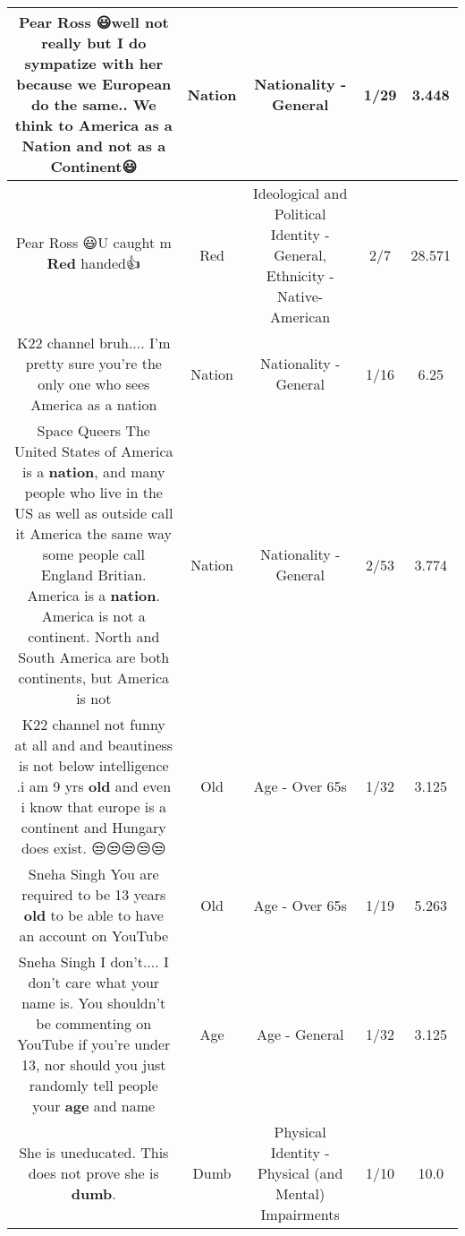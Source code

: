 \documentclass[11pt]{article}
\newlength\mylength
\begin{document}
\begin{center}
\begin{longtable}{|C{.65\mylength}|C{.30\mylength}|C{.12\mylength}|C{.12\mylength}|C{.12\mylength}|}
  \small Pear Ross 😃well not really but I do sympatize with her because we European do the same.. We think to America as a \textbf{Nation} and not as a Continent😃\normalsize   & Nation & Nationality - General & 1/29 & 3.448 \\  \hline
  \small Pear Ross 😃U caught m \textbf{R\textbf{ed}} handed👍\normalsize   & Red &  Ideological and Political Identity - General, Ethnicity - Native-American & 2/7 & 28.571 \\  \hline
  \small K22 channel bruh.... I'm pretty sure you're the only one who sees America as a nation\normalsize   & Nation & Nationality - General & 1/16 & 6.25 \\  \hline
  \small Space Queers The United States of America is a \textbf{nation}, and many people who live in the US as well as outside call it America the same way some people call England Britian. America is a \textbf{nation}. America is not a continent. North and South America are both continents, but America is not\normalsize   & Nation & Nationality - General & 2/53 & 3.774 \\  \hline
  \small K22 channel not funny at all and and beautiness is not below intelligence .i am 9 yrs \textbf{old} and even i know that europe is a continent and Hungary does exist. 😒😒😒😒😒\normalsize   & Old & Age - Over 65s & 1/32 & 3.125 \\  \hline
  \small Sneha Singh You are required to be 13 years \textbf{old} to be able to have an account on YouTube\normalsize   & Old & Age - Over 65s & 1/19 & 5.263 \\  \hline
  \small Sneha Singh I don't.... I don't care what your name is. You shouldn't be commenting on YouTube if you're under 13, nor should you just randomly tell people your \textbf{age} and name\normalsize   & Age & Age - General & 1/32 & 3.125 \\  \hline
  \small She is uneducated. This does not prove she is \textbf{dumb}.\normalsize   & Dumb & Physical Identity - Physical (and Mental) Impairments & 1/10 & 10.0 \\  \hline

\end{longtable}
\end{center}
\end{document}
